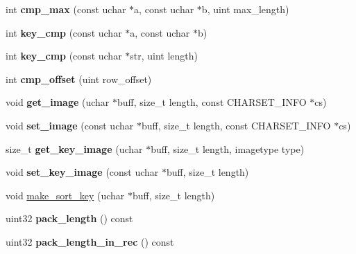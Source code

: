 \begin{DoxyCompactItemize}
int {\bfseries cmp\+\_\+max} (const uchar $\ast$a, const uchar $\ast$b, uint max\+\_\+length)
\item 
\mbox{\label{classField__bit_a5ae980653c8bbf15539eef10e18ce54e}} 
int {\bfseries key\+\_\+cmp} (const uchar $\ast$a, const uchar $\ast$b)
\item 
\mbox{\label{classField__bit_a3bc633f128121e1ae6d8fafb4879ded3}} 
int {\bfseries key\+\_\+cmp} (const uchar $\ast$str, uint length)
\item 
\mbox{\label{classField__bit_a909139b22bbbf65bf808005a5019f1ef}} 
int {\bfseries cmp\+\_\+offset} (uint row\+\_\+offset)
\item 
\mbox{\label{classField__bit_a1bae0876405ec31135d26f690691fec5}} 
void {\bfseries get\+\_\+image} (uchar $\ast$buff, size\+\_\+t length, const C\+H\+A\+R\+S\+E\+T\+\_\+\+I\+N\+FO $\ast$cs)
\item 
\mbox{\label{classField__bit_a751b83c2fcf55b6d6d42b4e799c06e0a}} 
void {\bfseries set\+\_\+image} (const uchar $\ast$buff, size\+\_\+t length, const C\+H\+A\+R\+S\+E\+T\+\_\+\+I\+N\+FO $\ast$cs)
\item 
\mbox{\label{classField__bit_a3c3998e1cb95c71c44ff9884b4cdce2d}} 
size\+\_\+t {\bfseries get\+\_\+key\+\_\+image} (uchar $\ast$buff, size\+\_\+t length, imagetype type)
\item 
\mbox{\label{classField__bit_ab7559ce4e9c8d888ff86420a82cecbc1}} 
void {\bfseries set\+\_\+key\+\_\+image} (const uchar $\ast$buff, size\+\_\+t length)
\item 
void \mbox{\hyperlink{classField__bit_a60fd8681fd22c528f2b997cb6dd68548}{make\+\_\+sort\+\_\+key}} (uchar $\ast$buff, size\+\_\+t length)
\item 
\mbox{\label{classField__bit_a45ec4cbecebea87b7f92e8f4fdea7df6}} 
uint32 {\bfseries pack\+\_\+length} () const
\item 
\mbox{\label{classField__bit_afc737cc78ead2482de2a17bd7a5b3780}} 
uint32 {\bfseries pack\+\_\+length\+\_\+in\+\_\+rec} () const

\end{DoxyCompactItemize}

